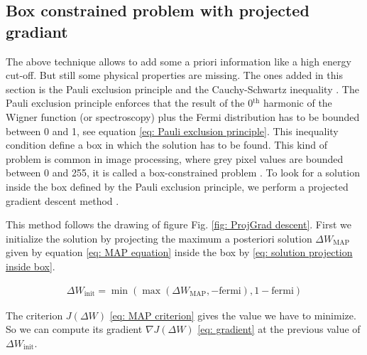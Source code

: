 

\subsection{\texorpdfstring{Box constrained problem with projected gradiant}{Box-constraint problem with projected gradiant}}


The above technique allows to add some a priori information like a high energy cut-off. But still some physical properties are missing. The ones added in this section is the Pauli exclusion principle and the Cauchy-Schwartz inequality \cite{ferraro2013wigner}. The Pauli exclusion principle enforces that the result of the 0$^{\mathrm{th}}$ harmonic of the Wigner function (or spectroscopy) plus the Fermi distribution has to be bounded between 0 and 1, see equation \eqref{eq: Pauli exclusion principle}. This inequality condition define a box in which the solution has to be found. This kind of problem is common in image processing, where grey pixel values are bounded between 0 and 255, it is called a box-constrained problem \cite{afonso2011augmented} \cite{lanteri2002penalized} \cite{chan2012multiplicative} \cite{bardsley2012mcmc2}. To look for a solution inside the box defined by the Pauli exclusion principle, we perform a projected gradient descent method \cite{figueiredo2007gradient} \cite{bertsekas1997nonlinear}.

This method follows the drawing of figure Fig. \ref{fig: ProjGrad descent}. First we initialize the solution by projecting the maximum a posteriori solution $\Delta W_{\mathrm{MAP}}$ given by equation \eqref{eq: MAP equation} inside the box by \eqref{eq: solution projection inside box}.

\begin{eqnarray}
\Delta W_{\mathrm{init}} = \min\left(\max\left(\Delta W_{\mathrm{MAP}} ,-\mathrm{fermi} \right),1-\mathrm{fermi} \right)  \label{eq: solution projection inside box}
\end{eqnarray}

The criterion $J\left(\Delta W\right)$ \eqref{eq: MAP criterion} gives the value we have to minimize. So we can compute its gradient $\nabla J\left(\Delta W\right)$ \eqref{eq: gradient} at the previous value of $\Delta W_{\mathrm{init}}$.

